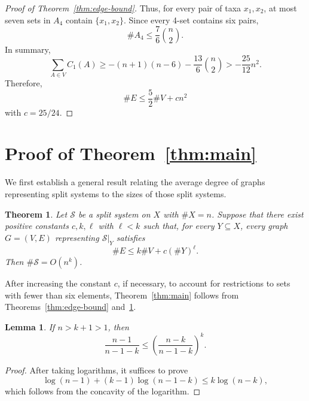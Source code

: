 \documentclass[11pt]{article}
\newtheorem{theorem}{Theorem}
\newtheorem{lemma}{Lemma}
\newcommand{\cS}{\mathcal{S}}
\newcommand{\cA}{A}
\begin{document}
\begin{proof}[Proof of Theorem~\ref{thm:edge-bound}]
		Thus, for every pair of taxa $x_1,x_2$, at most seven sets in $\cA_4$ contain $\{x_1,x_2\}$. Since every 4-set contains six pairs,
		\[
		\#\cA_4\le\frac{7}{6}\binom{n}{2}.
		\]
		In summary,
		\[
		\sum_{A\in V}C_1(A)
		\ge -(n+1)(n-6)-\frac{13}{6}\binom{n}{2}
		> -\frac{25}{12}n^2.
		\]
		Therefore,
		\[
		\#E\le \frac{5}{2}\#V+cn^2
		\]
		with $c=25/24$.
	\end{proof}
	
	\section{Proof of Theorem~\ref{thm:main}}
	
	We first establish a general result relating the average degree of graphs representing split systems to the sizes of those split systems.
	
	\begin{theorem}\label{thm:recurrence}
		Let $\cS$ be a split system on $X$ with $\#X=n$. Suppose that there exist positive constants $c,k,\ell$ with $\ell<k$ such that, for every $Y\subseteq X$, every graph $G=(V,E)$ representing $\cS|_Y$ satisfies
		\begin{equation}\label{eq:general-edge-bound}
			\#E\le k\#V+c(\#Y)^{\ell}.
		\end{equation}
		Then $\#\cS=O(n^k)$.
	\end{theorem}
	
	After increasing the constant $c$, if necessary, to account for restrictions to sets with fewer than six elements, Theorem~\ref{thm:main} follows from Theorems~\ref{thm:edge-bound} and~\ref{thm:recurrence}.
	
	\begin{lemma}\label{lem:log-concavity}
		If $n>k+1>1$, then
		\[
		\frac{n-1}{n-1-k}\le\left(\frac{n-k}{n-1-k}\right)^k.
		\]
	\end{lemma}
	
	\begin{proof}
		After taking logarithms, it suffices to prove
		\[
		\log(n-1)+(k-1)\log(n-1-k)\le k\log(n-k),
		\]
		which follows from the concavity of the logarithm.
	\end{proof}
	
\end{document}
